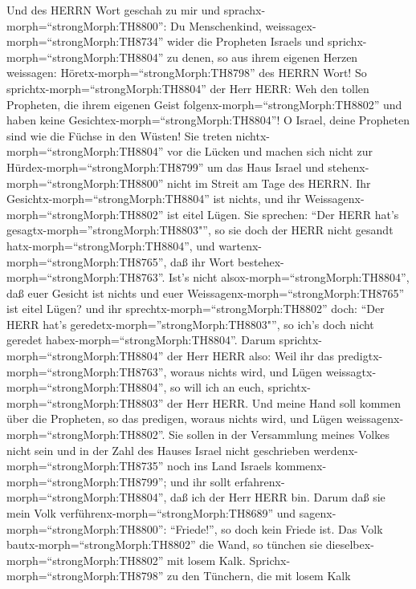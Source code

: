  Und des HERRN Wort geschah zu mir und
sprachx-morph=``strongMorph:TH8800'':  Du Menschenkind,
weissagex-morph=``strongMorph:TH8734'' wider die Propheten Israels und
sprichx-morph=``strongMorph:TH8804'' zu denen, so aus ihrem eigenen
Herzen weissagen: Höretx-morph=``strongMorph:TH8798'' des HERRN Wort!
 So sprichtx-morph=``strongMorph:TH8804'' der Herr HERR: Weh
den tollen Propheten, die ihrem eigenen Geist
folgenx-morph=``strongMorph:TH8802'' und haben keine
Gesichtex-morph=``strongMorph:TH8804''!  O Israel, deine
Propheten sind wie die Füchse in den Wüsten!  Sie treten
nichtx-morph=``strongMorph:TH8804'' vor die Lücken und machen sich nicht
zur Hürdex-morph=``strongMorph:TH8799'' um das Haus Israel und
stehenx-morph=``strongMorph:TH8800'' nicht im Streit am Tage des HERRN.
 Ihr Gesichtx-morph=``strongMorph:TH8804'' ist nichts, und
ihr Weissagenx-morph=``strongMorph:TH8802'' ist eitel Lügen. Sie
sprechen: ``Der HERR hat's gesagtx-morph=''strongMorph:TH8803"'', so sie
doch der HERR nicht gesandt hatx-morph=``strongMorph:TH8804'', und
wartenx-morph=``strongMorph:TH8765'', daß ihr Wort
bestehex-morph=``strongMorph:TH8763''.  Ist's nicht
alsox-morph=``strongMorph:TH8804'', daß euer Gesicht ist nichts und euer
Weissagenx-morph=``strongMorph:TH8765'' ist eitel Lügen? und ihr
sprechtx-morph=``strongMorph:TH8802'' doch: ``Der HERR hat's
geredetx-morph=''strongMorph:TH8803"'', so ich's doch nicht geredet
habex-morph=``strongMorph:TH8804''.  Darum
sprichtx-morph=``strongMorph:TH8804'' der Herr HERR also: Weil ihr das
predigtx-morph=``strongMorph:TH8763'', woraus nichts wird, und Lügen
weissagtx-morph=``strongMorph:TH8804'', so will ich an euch,
sprichtx-morph=``strongMorph:TH8803'' der Herr HERR.  Und
meine Hand soll kommen über die Propheten, so das predigen, woraus
nichts wird, und Lügen weissagenx-morph=``strongMorph:TH8802''. Sie
sollen in der Versammlung meines Volkes nicht sein und in der Zahl des
Hauses Israel nicht geschrieben werdenx-morph=``strongMorph:TH8735''
noch ins Land Israels kommenx-morph=``strongMorph:TH8799''; und ihr
sollt erfahrenx-morph=``strongMorph:TH8804'', daß ich der Herr HERR bin.
 Darum daß sie mein Volk
verführenx-morph=``strongMorph:TH8689'' und
sagenx-morph=``strongMorph:TH8800'': ``Friede!'', so doch kein Friede
ist. Das Volk bautx-morph=``strongMorph:TH8802'' die Wand, so tünchen
sie dieselbex-morph=``strongMorph:TH8802'' mit losem Kalk. 
Sprichx-morph=``strongMorph:TH8798'' zu den Tünchern, die mit losem Kalk
